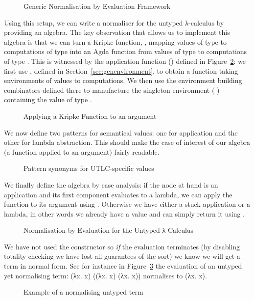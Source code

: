 \begin{figure}[h]
\caption{Generic Normalisation by Evaluation Framework\label{defn:NbE}}
\end{figure}

Using this setup, we can write a normaliser for the untyped λ-calculus
by providing an algebra. The key observation that allows us to implement
this algebra is that we can turn a Kripke function, , mapping values
of type  to computations of type  into an Agda function from
values of type  to computations of type . This is witnessed
by the application function (\AF{\_\$\$\_}) defined in Figure~\ref{fig:kripkeapp}:
we first use , defined in Section~\ref{sec:genenvironment}, to obtain
a function taking environments of values to computations. We then use the environment building
combinators defined there to manufacture the singleton
environment {(  )} containing the value  of type
.

\begin{figure}[h]
\caption{Applying a Kripke Function to an argument}\label{fig:kripkeapp}
\end{figure}

We now define two patterns for semantical values: one for application and
the other for lambda abstraction. This should make the case of interest of
our algebra (a function applied to an argument) fairly readable.

\begin{figure}[h]
\caption{Pattern synonyms for UTLC-specific  values}
\end{figure}

We finally define the algebra by case analysis: if the node at hand is an
application and its first component evaluates to a lambda, we can apply
the function to its argument using \AF{\_\$\$\_}. Otherwise we have either a
stuck application or a lambda, in other words we already have a value and can
simply return it using .

\begin{figure}[h]
\caption{Normalisation by Evaluation for the Untyped λ-Calculus}
\end{figure}

We have not used the  constructor so \emph{if} the evaluation terminates
(by disabling totality checking we have lost all guarantees of the sort) we know
we will get a term in normal form. See for instance in
Figure~\ref{fig:normuntyped} the evaluation of an untyped yet normalising
term: {(λx. x) ((λx. x) (λx. x))} normalises to {(λx. x)}.

\begin{figure}[h]
\caption{Example of a normalising untyped term}
\label{fig:normuntyped}
\end{figure}
